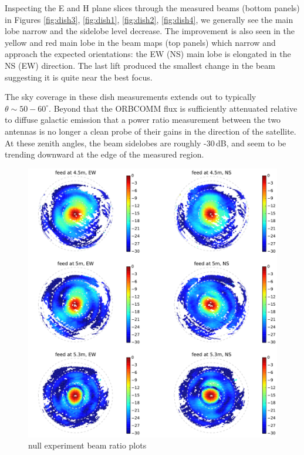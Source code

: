 \documentclass{emulateapj}
\begin{document}
Inspecting the E and H plane slices through the measured beams (bottom panels) in Figures \ref{fig:dish3}, \ref{fig:dish1}, \ref{fig:dish2}, \ref{fig:dish4}, we generally see the main lobe narrow and the sidelobe level decrease. The improvement is also seen in the yellow and red main lobe in the beam maps (top panels) which narrow and approach the expected orientations: the EW (NS) main lobe is elongated in the NS (EW) direction. The last lift produced the smallest change in the beam suggesting it is quite near the best focus. 

The sky coverage in these dish measurements extends out to typically $\theta\sim50-60^\circ$. Beyond that the ORBCOMM flux is sufficiently attenuated relative to diffuse galactic emission that a power ratio measurement between the two antennas is no longer a clean probe of their gains in the direction of the satellite. At these zenith angles, the beam sidelobes are roughly -30\,dB, and seem to be trending downward at the edge of the measured region.



\begin{figure}[t]
\centering
\includegraphics[width=6.7in]{measured_beams_and_models_maps.pdf}
\caption{null experiment beam ratio plots}
\label{fig:measuredbeammaps}
\end{figure}
\end{document}
